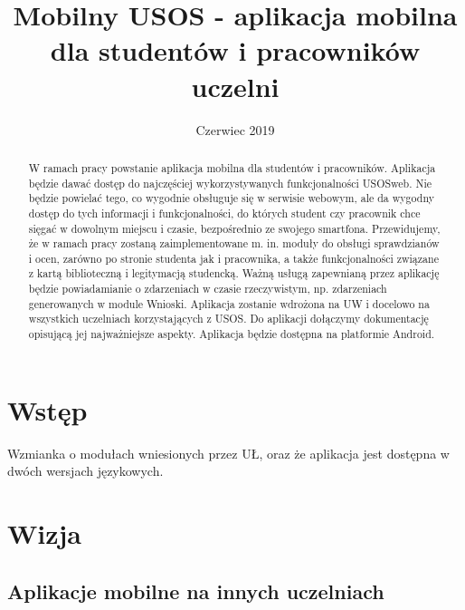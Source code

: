 \documentclass{pracamgr}
\title{Mobilny USOS - aplikacja mobilna dla studentów i pracowników uczelni}
\date{Czerwiec 2019}
\begin{document}
\maketitle
\begin{abstract}
  W ramach pracy powstanie aplikacja mobilna dla
  studentów i pracowników. Aplikacja będzie dawać dostęp do najczęściej wykorzystywanych 
  funkcjonalności USOSweb. Nie będzie powielać tego, co wygodnie obsługuje się w serwisie 
  webowym, ale da wygodny dostęp do tych informacji i funkcjonalności, do których student czy 
  pracownik chce sięgać w dowolnym miejscu i czasie, bezpośrednio ze swojego smartfona. 
  Przewidujemy, że w ramach pracy zostaną zaimplementowane m. in. moduły do obsługi 
  sprawdzianów i ocen, zarówno po stronie studenta jak i pracownika, a także funkcjonalności 
  związane z kartą biblioteczną i legitymacją studencką. Ważną usługą zapewnianą przez 
  aplikację będzie powiadamianie o zdarzeniach w czasie rzeczywistym, np. zdarzeniach 
  generowanych w module Wnioski. Aplikacja zostanie wdrożona na UW i docelowo na 
  wszystkich uczelniach korzystających z USOS. Do aplikacji dołączymy dokumentację opisującą 
  jej najważniejsze aspekty. Aplikacja będzie dostępna na platformie Android.
\end{abstract}

\tableofcontents

\chapter{Wstęp}

Wzmianka o modułach wniesionych przez UŁ, oraz że aplikacja jest dostępna
w dwóch wersjach językowych.


\chapter{Wizja}

\section{Aplikacje mobilne na innych uczelniach}
\end{document}
